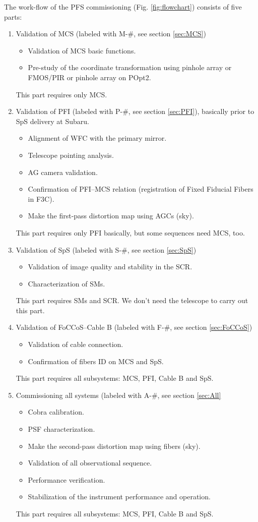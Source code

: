 The work-flow of the PFS commissioning (Fig. \ref{fig:flowchart}) consists of five parts: 
\begin{enumerate}
\item Validation of MCS (labeled with M-\#, see section \ref{sec:MCS})
 \begin{itemize}
 \item Validation of MCS basic functions.
 \item Pre-study of the coordinate transformation using pinhole array or FMOS/PIR or pinhole array on POpt2.
 \end{itemize}
This part requires only MCS.
\item Validation of PFI (labeled with P-\#, see section \ref{sec:PFI}), basically prior to SpS delivery at Subaru.
 \begin{itemize}
 \item Alignment of WFC with the primary mirror.
 \item Telescope pointing analysis.
 \item AG camera validation.
 \item Confirmation of PFI--MCS relation (registration of Fixed Fiducial Fibers in F3C).
 \item Make the first-pass distortion map using AGCs (sky).
 \end{itemize}
This part requires only PFI basically, but some sequences need MCS, too.
\item Validation of SpS (labeled with S-\#, see section \ref{sec:SpS})
 \begin{itemize}
 \item Validation of image quality and stability in the SCR.
 \item Characterization of SMs.
 \end{itemize}
This part requires SMs and SCR.
We don't need the telescope to carry out this part.
\item Validation of FoCCoS--Cable B (labeled with F-\#, see section \ref{sec:FoCCoS})
 \begin{itemize}
 \item Validation of cable connection.
 \item Confirmation of fibers ID on MCS and SpS.
 \end{itemize}
This part requires all subsystems: MCS, PFI, Cable B and SpS.
\item Commissioning all systems (labeled with A-\#, see section \ref{sec:All}
 \begin{itemize}
 \item Cobra calibration.
 \item PSF characterization.
 \item Make the second-pass distortion map using fibers (sky).
 \item Validation of all observational sequence.
 \item Performance verification.
 \item Stabilization of the instrument performance and operation.
 \end{itemize}
This part requires all subsystems: MCS, PFI, Cable B and SpS.
\end{enumerate}

